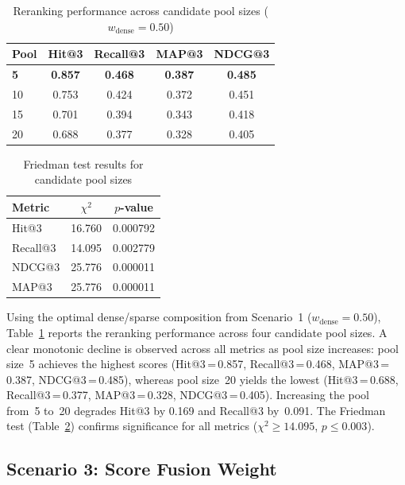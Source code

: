 \documentclass[conference]{IEEEtran}
\begin{document}
\begin{table}[H]
\centering
\caption{Reranking performance across candidate pool sizes ($w_{\text{dense}}=0.50$)}
\label{tab:pool}
\small
\begin{tabular}{lcccc}
\toprule
Pool & Hit@3 & Recall@3 & MAP@3 & NDCG@3 \\
\midrule
\textbf{5}  & \textbf{0.857} & \textbf{0.468} & \textbf{0.387} & \textbf{0.485} \\
10 & 0.753 & 0.424 & 0.372 & 0.451 \\
15 & 0.701 & 0.394 & 0.343 & 0.418 \\
20 & 0.688 & 0.377 & 0.328 & 0.405 \\
\bottomrule
\end{tabular}
\end{table}

\begin{table}[H]
\centering
\caption{Friedman test results for candidate pool sizes}
\label{tab:pool_friedman}
\small
\begin{tabular}{lcc}
\toprule
Metric & $\chi^2$ & $p$-value \\
\midrule
Hit@3    & 16.760 & 0.000792 \\
Recall@3 & 14.095 & 0.002779 \\
NDCG@3   & 25.776 & 0.000011 \\
MAP@3    & 25.776 & 0.000011 \\
\bottomrule
\end{tabular}
\end{table}

Using the optimal dense/sparse composition from Scenario~1
($w_{\text{dense}}=0.50$), Table~\ref{tab:pool} reports the reranking
performance across four candidate pool sizes. A clear monotonic decline
is observed across all metrics as pool size increases: pool size~5
achieves the highest scores (Hit@3\,=\,0.857, Recall@3\,=\,0.468,
MAP@3\,=\,0.387, NDCG@3\,=\,0.485), whereas pool size~20 yields the
lowest (Hit@3\,=\,0.688, Recall@3\,=\,0.377, MAP@3\,=\,0.328,
NDCG@3\,=\,0.405). Increasing the pool from~5 to~20 degrades Hit@3
by 0.169 and Recall@3 by~0.091. The Friedman test
(Table~\ref{tab:pool_friedman}) confirms significance for all metrics
($\chi^2 \geq 14.095$, $p \leq 0.003$).

\subsection{Scenario 3: Score Fusion Weight}
\end{document}
